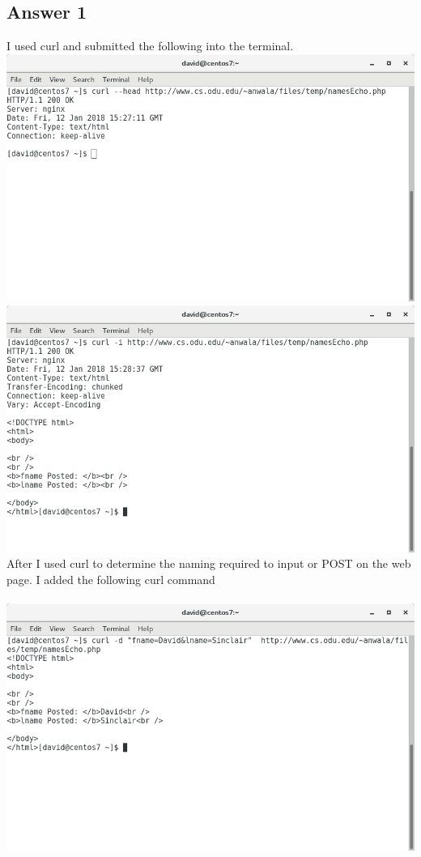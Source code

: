 \documentclass[10pt,letterpaper]{article}
\begin{document}
\subsection{Answer 1}
I used curl and submitted the following into the terminal.
\\
\includegraphics[scale=.25]{curl_head.png}
\includegraphics[scale=.25]{curl_i.png}
\\
After I used curl to determine the naming required to input or POST on the web page.  I added the following curl command\\
\\
\includegraphics[scale=.25]{curl_results.png} 
\end{document}
